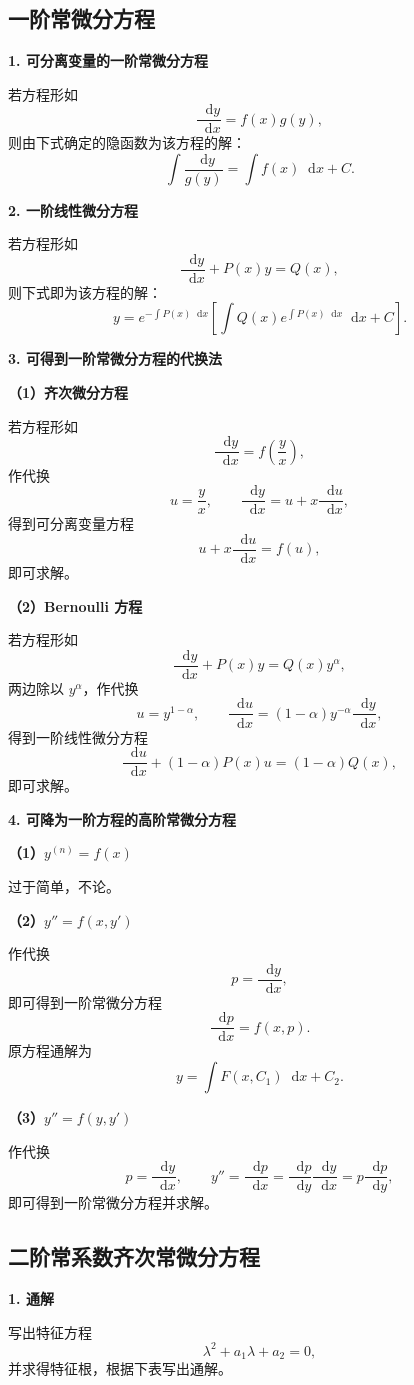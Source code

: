 \documentclass[UTF8,fontset=fandol,zihao=5]{ctexart}
\newcommand{\dd}{\mathop{}\!\mathrm{d}}
\begin{document}
\subsection{一阶常微分方程}

\textbf{1. 可分离变量的一阶常微分方程}

若方程形如
\[
\frac{\dd y}{\dd x}=f(x)g(y),
\]
则由下式确定的隐函数为该方程的解：
\[
\int\frac{\dd y}{g(y)}=\int f(x)\dd x+C.
\]

\textbf{2. 一阶线性微分方程}

若方程形如
\[
\frac{\dd y}{\dd x}+P(x)y=Q(x),
\]
则下式即为该方程的解：
\[
y=e^{-\int P(x)\dd x}
\left[\int Q(x)e^{\int P(x)\dd x}\dd x+C\right].
\]

\textbf{3. 可得到一阶常微分方程的代换法}

\textbf{（1）齐次微分方程}

若方程形如
\[
\frac{\dd y}{\dd x}=f\!\left(\frac yx\right),
\]
作代换
\[
u=\frac yx,
\qquad
\frac{\dd y}{\dd x}=u+x\frac{\dd u}{\dd x},
\]
得到可分离变量方程
\[
u+x\frac{\dd u}{\dd x}=f(u),
\]
即可求解。

\textbf{（2）Bernoulli 方程}

若方程形如
\[
\frac{\dd y}{\dd x}+P(x)y=Q(x)y^\alpha,
\]
两边除以 $y^\alpha$，作代换
\[
u=y^{1-\alpha},
\qquad
\frac{\dd u}{\dd x}=(1-\alpha)y^{-\alpha}\frac{\dd y}{\dd x},
\]
得到一阶线性微分方程
\[
\frac{\dd u}{\dd x}+(1-\alpha)P(x)u=(1-\alpha)Q(x),
\]
即可求解。

\textbf{4. 可降为一阶方程的高阶常微分方程}

\textbf{（1）$y^{(n)}=f(x)$}

过于简单，不论。

\textbf{（2）$y''=f(x,y')$}

作代换
\[
p=\frac{\dd y}{\dd x},
\]
即可得到一阶常微分方程
\[
\frac{\dd p}{\dd x}=f(x,p).
\]
原方程通解为
\[
y=\int F(x,C_1)\dd x+C_2.
\]

\textbf{（3）$y''=f(y,y')$}

作代换
\[
p=\frac{\dd y}{\dd x},
\qquad
y''=\frac{\dd p}{\dd x}
=\frac{\dd p}{\dd y}\frac{\dd y}{\dd x}
=p\frac{\dd p}{\dd y},
\]
即可得到一阶常微分方程并求解。

\subsection{二阶常系数齐次常微分方程}

\textbf{1. 通解}

写出特征方程
\[
\lambda^2+a_1\lambda+a_2=0,
\]
并求得特征根，根据下表写出通解。
\end{document}

